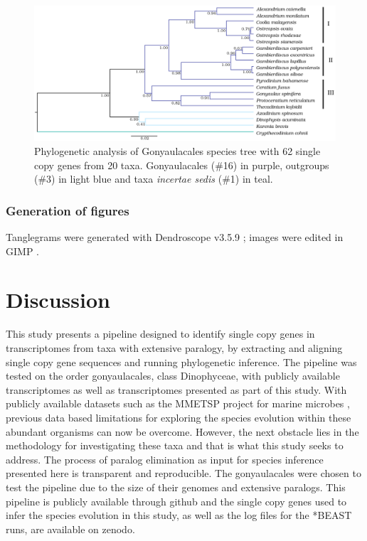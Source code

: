 \documentclass[12pt]{article}
\begin{document}
\FloatBarrier 
\begin{figure} 
\includegraphics[scale=.25]{Aug2_20-taxa-combined-fig_MCC_trees_gimp.png} 
\caption{Phylogenetic analysis of Gonyaulacales species tree with 62 single copy genes from 20 taxa. Gonyaulacales (\#16) in purple, outgroups (\#3) in light blue and taxa \textit{incertae sedis} (\#1) in teal.} 
\label{fig:phylo}
\end{figure} 
\FloatBarrier

\subsubsection*{Generation of figures}
Tanglegrams were generated with Dendroscope v3.5.9 \cite{huson2007dendroscope}; images were edited in GIMP \cite{gimp}.
\newpage
\section{Discussion}
This study presents a pipeline designed to identify single copy genes in transcriptomes from taxa with extensive paralogy, by extracting and aligning single copy gene sequences and running phylogenetic inference. 
The pipeline was tested on the order gonyaulacales, class Dinophyceae, with publicly available transcriptomes as well as transcriptomes presented as part of this study. 
With publicly available datasets such as the MMETSP project for marine microbes \cite{keeling2014marine}, previous data based limitations for exploring the species evolution within these abundant organisms can now be overcome. 
However, the next obstacle lies in the methodology for investigating these taxa and that is what this study seeks to address. 
The process of paralog elimination as input for species inference presented here is transparent and reproducible. 
The gonyaulacales were chosen to test the pipeline due to the size of their genomes and extensive paralogs.
This pipeline is publicly available through github and the single copy genes used to infer the species evolution in this study, as well as the log files for the *BEAST runs, are available on zenodo.
\end{document}
